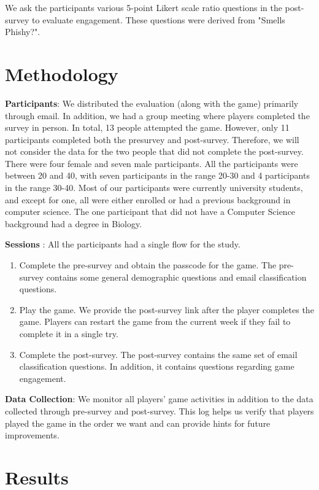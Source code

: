 We ask the participants various 5-point Likert scale ratio questions in the post-survey to evaluate engagement. These questions were derived from "Smells Phishy?"\cite{smels_phishy}.

\section{Methodology}
\textbf{Participants}: We distributed the evaluation (along with the game) primarily through email. In addition, we had a group meeting where players completed the survey in person. In total, 13 people attempted the game. However, only 11 participants completed both the presurvey and post-survey. Therefore, we will not consider the data for the two people that did not complete the post-survey. There were four female and seven male participants. All the participants were between 20 and 40, with seven participants in the range 20-30 and 4 participants in the range 30-40. Most of our participants were currently university students, and except for one, all were either enrolled or had a previous background in computer science. The one participant that did not have a Computer Science background had a degree in Biology.

\textbf{Sessions} : All the participants had a single flow for the study.
\begin{enumerate}
    \setlength{\itemsep}{0pt}
    \setlength{\parskip}{0pt}
    \setlength{\topsep}{0pt}
    \item Complete the pre-survey and obtain the passcode for the game. The pre-survey contains some general demographic questions and email classification questions.
    \item  Play the game. We provide the post-survey link after the player completes the game. Players can restart the game from the current week if they fail to complete it in a single try.
    \item Complete the post-survey. The post-survey contains the same set of email classification questions. In addition, it contains questions regarding game engagement.
\end{enumerate}

\textbf{Data Collection}:  We monitor all players' game activities in addition to the data collected through pre-survey and post-survey. This log helps us verify that players played the game in the order we want and can provide hints for future improvements.

\section{Results}
